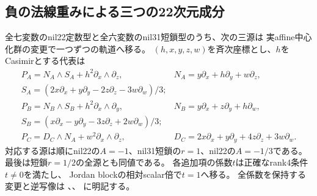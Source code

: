\documentclass[a4paper,11pt]{ltjsarticle}
\theoremstyle{definition}
\begin{document}
\subsection{負の法線重みによる三つの22次元成分}
全七変数のnil22定数型と全六変数のnil31短鎖型のうち、次の三源は
実affine中心化群の変更で一つずつの軌道へ移る。
$(h,x,y,z,w)$を斉次座標とし、$h$をCasimirとする代表は
\[
\begin{array}{ll}
 P_A=N_A\wedge S_A+h^2\partial_x\wedge\partial_z,&
 N_A=y\partial_x+h\partial_y+w\partial_z,\\
 S_A=(2x\partial_x+y\partial_y-2z\partial_z-3w\partial_w)/3;&\\
 P_B=N_B\wedge S_B+h^2\partial_x\wedge\partial_y,&
 N_B=y\partial_x+z\partial_y+h\partial_w,\\
 S_B=(x\partial_x-y\partial_y-3z\partial_z+2w\partial_w)/3;&\\
 P_C=D_C\wedge N_A+w^2\partial_x\wedge\partial_z,&
 D_C=2x\partial_x+y\partial_y+4z\partial_z+3w\partial_w.
\end{array}
\]
対応する源は順にnil22の$A=-1$、nil31短鎖の$r=1$、nil22の$A=-1/3$である。
最後は短鎖$r=1/2$の全源とも同値である。
各追加項の係数$t$は正確なrank4条件$t\ne0$を満たし、
Jordan blockの相対scalar倍で$t=1$へ移る。
全係数を保持する変更と逆写像は
、、
に明記する。
\end{document}
